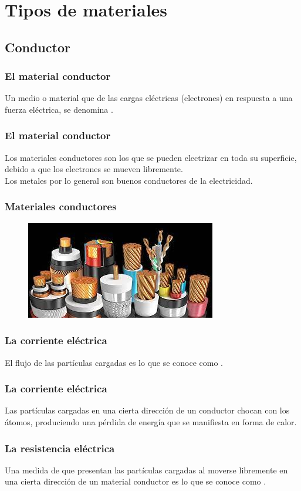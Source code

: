 \documentclass[14pt]{beamer}
\begin{document}
\section{Tipos de materiales}
\subsection{Conductor}

\begin{frame}
\frametitle{El material conductor}
Un medio o material que  de las cargas eléctricas (electrones)
en respuesta a una fuerza eléctrica, se denomina .
\end{frame}
\begin{frame}
\frametitle{El material conductor}    
Los materiales conductores son los que se pueden electrizar en toda su superficie, debido a que los electrones se mueven libremente.
\\
\bigskip
\pause
Los metales por lo general son buenos conductores de la electricidad.
\end{frame}
\begin{frame}
\frametitle{Materiales conductores}
\begin{figure}
    \centering
    \includegraphics[scale=0.8]{Imagenes/Materiales_Conductores_01.jpg}
\end{figure}
\end{frame}
\begin{frame}
\frametitle{La corriente eléctrica}
El flujo de las partículas cargadas es lo que se conoce como .
\end{frame}
\begin{frame}
\frametitle{La corriente eléctrica}
Las partículas cargadas en una cierta dirección de un conductor chocan con los átomos, \pause produciendo una pérdida de energía que se manifiesta en forma de calor.
\end{frame}
\begin{frame}
\frametitle{La resistencia eléctrica}
Una medida de  que presentan las partículas cargadas al moverse libremente en una cierta dirección de un material conductor \pause es lo que se conoce como .
\end{frame}
\end{document}
